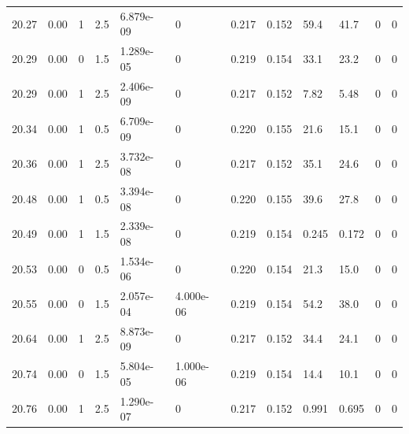 \documentclass[preview]{standalone}
\begin{document}
{{{{{{{{{\begin{tabular}{L{1.2cm}C{1.2cm} C{0.3cm}C{0.5cm} C{1.4cm}C{1.4cm} C{1.4cm}C{1.4cm} C{1.6cm}C{1.6cm} C{1.6cm}C{1.6cm}}
  20.27  &  0.00  & 1     & 2.5 &  6.879e-09  & 0  &  0.217&   0.152& 59.4 & 41.7   &  0 & 0  \\ 
  20.29  &  0.00  & 0     & 1.5 &  1.289e-05  & 0  &  0.219&   0.154& 33.1 & 23.2   &  0 & 0  \\ 
  20.29  &  0.00  & 1     & 2.5 &  2.406e-09  & 0  &  0.217&   0.152& 7.82 & 5.48   &  0 & 0  \\ 
  20.34  &  0.00  & 1     & 0.5 &  6.709e-09  & 0  &  0.220&   0.155& 21.6 & 15.1   &  0 & 0  \\ 
  20.36  &  0.00  & 1     & 2.5 &  3.732e-08  & 0  &  0.217&   0.152& 35.1 & 24.6   &  0 & 0  \\ 
  20.48  &  0.00  & 1     & 0.5 &  3.394e-08  & 0  &  0.220&   0.155& 39.6 & 27.8   &  0 & 0  \\ 
  20.49  &  0.00  & 1     & 1.5 &  2.339e-08  & 0  &  0.219&   0.154& 0.245 & 0.172   &  0 & 0  \\ 
  20.53  &  0.00  & 0     & 0.5 &  1.534e-06  & 0  &  0.220&   0.154& 21.3 & 15.0   &  0 & 0  \\ 
  20.55  &  0.00  & 0     & 1.5 &  2.057e-04  & 4.000e-06  &  0.219&   0.154& 54.2 & 38.0   &  0 & 0  \\ 
  20.64  &  0.00  & 1     & 2.5 &  8.873e-09  & 0  &  0.217&   0.152& 34.4 & 24.1   &  0 & 0  \\ 
  20.74  &  0.00  & 0     & 1.5 &  5.804e-05  & 1.000e-06  &  0.219&   0.154& 14.4 & 10.1   &  0 & 0  \\ 
  20.76  &  0.00  & 1     & 2.5 &  1.290e-07  & 0  &  0.217&   0.152& 0.991 & 0.695   &  0 & 0  \\ 
\hline 
\end{tabular} 

}}}}}}}}}
\end{document}
